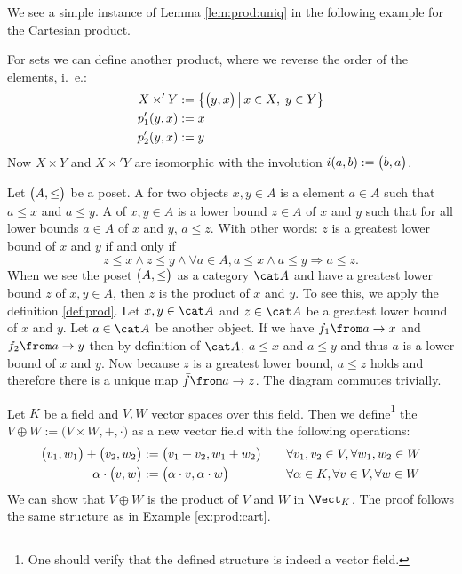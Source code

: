 We see a simple instance of Lemma \ref{lem:prod:uniq} in the following example for the Cartesian product.

\begin{example}
  \label{ex:prod:cart2}
  For sets we can define another product, where we reverse the order of the elements, i.~e.:
  \begin{alignat*}{2}
    X \times' Y &:= \bigl \{ \bigl( y , x \bigr) \,\big|\, x \in X, \; y \in Y \bigr \} \\
    p'_1(y,x)   &:= x \\
    p'_2(y,x)   &:= y
  \end{alignat*}
  Now $X \times Y$ and $X \times' Y$ are isomorphic with the involution $i(a, b) := \bigl( b , a \bigr)$.
\end{example}

\begin{example}[Posets]
  \label{ex:prod:poset}
  Let $\bigl( A , \le \bigr)$ be a poset.
  A  for two objects $x, y \in A$ is a element $a \in A$ such that $a \le x$ and $a \le y$.
  A  of $x, y \in A$ is a lower bound $z \in A$ of $x$ and $y$ such that for all lower bounds $a \in A$ of $x$ and $y$, $a \le z$.
  With other words: $z$ is a greatest lower bound of $x$ and $y$ if and only if
  $$z \le x \land z \le y \land \forall a \in A, a \le x \land a \le y \Rightarrow a \le z.$$
  When we see the poset $\bigl( A , \le \bigr)$ as a category $\catA$ and have a greatest lower bound $z$ of $x, y \in A$, then $z$ is the product of $x$ and $y$.
  To see this, we apply the definition \ref{def:prod}.
  Let $x, y \in \catA$ and $z \in \catA$ be a greatest lower bound of $x$ and $y$.
  Let $a \in \catA$ be another object.
  If we have $f_1 \from a \to x$ and $f_2 \from a \to y$ then by definition of $\catA$, $a \le x$ and $a \le y$ and thus $a$ is a lower bound of $x$ and $y$.
  Now because $z$ is a greatest lower bound, $a \le z$ holds and therefore there is a unique map $\fbar \from a \to z$.
  The diagram commutes trivially.
\end{example}

\begin{example}
  \label{ex:prod:vspace}
  Let $K$ be a field and $V, W$ vector spaces over this field.
  Then we define\footnote{One should verify that the defined structure is indeed a vector field.}
  the  $V \oplus W := \bigl(V \times W, +, \cdot \bigr)$ as a new vector field with the following operations:
  \begin{alignat*}{4}
    \bigl( v_1 , w_1 \bigr) + \bigl( v_2 , w_2 \bigr) &:= \bigl( v_1 + v_2 , w_1 + w_2 \bigr)           &\quad& \forall v_1, v_2 \in V, \forall w_1, w_2 \in W \\
    \alpha \cdot \bigl( v , w \bigr)          &:= \bigl( \alpha \cdot v , \alpha \cdot w \bigr) &     & \forall \alpha \in K, \forall v \in V, \forall w \in W
  \end{alignat*}
  We can show that $V \oplus W$ is the product of $V$ and $W$ in $\Vect_K$.
  The proof follows the same structure as in Example \ref{ex:prod:cart}.
\end{example}

